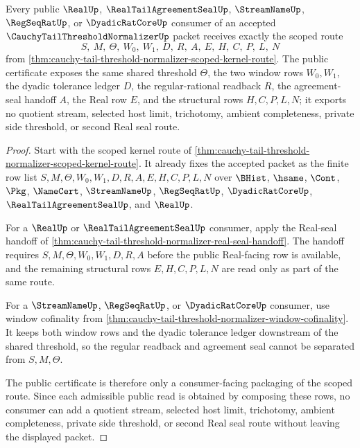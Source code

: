 \begin{theorem}
\label{thm:cauchy-tail-threshold-normalizer-public-certificate}
Every public $\RealUp$, $\RealTailAgreementSealUp$, $\StreamNameUp$, $\RegSeqRatUp$, or $\DyadicRatCoreUp$ consumer of an accepted $\CauchyTailThresholdNormalizerUp$ packet receives exactly the scoped route
$$
S,\ M,\ \Theta,\ W_0,\ W_1,\ D,\ R,\ A,\ E,\ H,\ C,\ P,\ L,\ N
$$
from \autoref{thm:cauchy-tail-threshold-normalizer-scoped-kernel-route}. The public certificate exposes the same shared threshold $\Theta$, the two window rows $W_0,W_1$, the dyadic tolerance ledger $D$, the regular-rational readback $R$, the agreement-seal handoff $A$, the Real row $E$, and the structural rows $H,C,P,L,N$; it exports no quotient stream, selected host limit, trichotomy, ambient completeness, private side threshold, or second Real seal route.
\end{theorem}
\begin{proof}
Start with the scoped kernel route of \autoref{thm:cauchy-tail-threshold-normalizer-scoped-kernel-route}. It already fixes the accepted packet as the finite row list $S,M,\Theta,W_0,W_1,D,R,A,E,H,C,P,L,N$ over $\BHist$, $\hsame$, $\Cont$, $\Pkg$, $\NameCert$, $\StreamNameUp$, $\RegSeqRatUp$, $\DyadicRatCoreUp$, $\RealTailAgreementSealUp$, and $\RealUp$.

For a $\RealUp$ or $\RealTailAgreementSealUp$ consumer, apply the Real-seal handoff of \autoref{thm:cauchy-tail-threshold-normalizer-real-seal-handoff}. The handoff requires $S,M,\Theta,W_0,W_1,D,R,A$ before the public Real-facing row is available, and the remaining structural rows $E,H,C,P,L,N$ are read only as part of the same route.

For a $\StreamNameUp$, $\RegSeqRatUp$, or $\DyadicRatCoreUp$ consumer, use window cofinality from \autoref{thm:cauchy-tail-threshold-normalizer-window-cofinality}. It keeps both window rows and the dyadic tolerance ledger downstream of the shared threshold, so the regular readback and agreement seal cannot be separated from $S,M,\Theta$.

The public certificate is therefore only a consumer-facing packaging of the scoped route. Since each admissible public read is obtained by composing these rows, no consumer can add a quotient stream, selected host limit, trichotomy, ambient completeness, private side threshold, or second Real seal route without leaving the displayed packet.
\end{proof}

